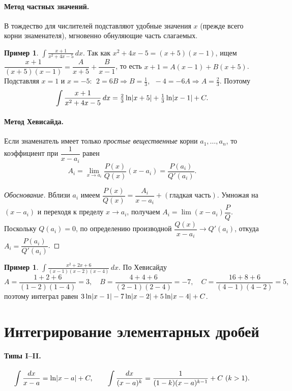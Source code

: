 \documentclass[11pt,a4paper]{article}
\theoremstyle{definition}
\newtheorem{example}[definition]{Пример}
\theoremstyle{plain}
\newcommand{\dx}{\,dx}
\DeclarePairedDelimiter{\abs}{\lvert}{\rvert}
\begin{document}
\paragraph{Метод частных значений.} В тождество для числителей подставляют удобные значения $x$
(прежде всего корни знаменателя), мгновенно обнуляющие часть слагаемых.

\begin{example}
$\displaystyle\int\frac{x+1}{x^2+4x-5}\dx$. Так как $x^2+4x-5=(x+5)(x-1)$, ищем
$\dfrac{x+1}{(x+5)(x-1)}=\dfrac{A}{x+5}+\dfrac{B}{x-1}$, то есть $x+1=A(x-1)+B(x+5)$. Подставляя
$x=1$ и $x=-5$: $\;2=6B\Rightarrow B=\tfrac13$, $\;-4=-6A\Rightarrow A=\tfrac23$. Поэтому
\[
  \int\frac{x+1}{x^2+4x-5}\dx=\tfrac23\ln\abs{x+5}+\tfrac13\ln\abs{x-1}+C.
\]
\end{example}

\paragraph{Метод Хевисайда.} Если знаменатель имеет только \emph{простые вещественные} корни
$a_1,\dots,a_n$, то коэффициент при $\dfrac1{x-a_i}$ равен
\[
  A_i=\lim_{x\to a_i}\frac{P(x)}{Q(x)}(x-a_i)=\frac{P(a_i)}{Q'(a_i)} .
\]
\begin{proof}[Обоснование]
Вблизи $a_i$ имеем $\dfrac{P(x)}{Q(x)}=\dfrac{A_i}{x-a_i}+(\text{гладкая часть})$. Умножая на
$(x-a_i)$ и переходя к пределу $x\to a_i$, получаем $A_i=\lim(x-a_i)\dfrac{P}{Q}$. Поскольку
$Q(a_i)=0$, по определению производной $\dfrac{Q(x)}{x-a_i}\to Q'(a_i)$, откуда
$A_i=\dfrac{P(a_i)}{Q'(a_i)}$.
\end{proof}

\begin{example}
$\displaystyle\int\frac{x^2+2x+6}{(x-1)(x-2)(x-4)}\dx$. По Хевисайду
\[
  A=\frac{1+2+6}{(1-2)(1-4)}=3,\quad
  B=\frac{4+4+6}{(2-1)(2-4)}=-7,\quad
  C=\frac{16+8+6}{(4-1)(4-2)}=5,
\]
поэтому интеграл равен $3\ln\abs{x-1}-7\ln\abs{x-2}+5\ln\abs{x-4}+C$.
\end{example}

\section{Интегрирование элементарных дробей}

\paragraph{Типы I–II.}
\[
  \int\frac{dx}{x-a}=\ln\abs{x-a}+C,\qquad
  \int\frac{dx}{(x-a)^k}=\frac{1}{(1-k)(x-a)^{k-1}}+C\ (k>1).
\]
\end{document}

